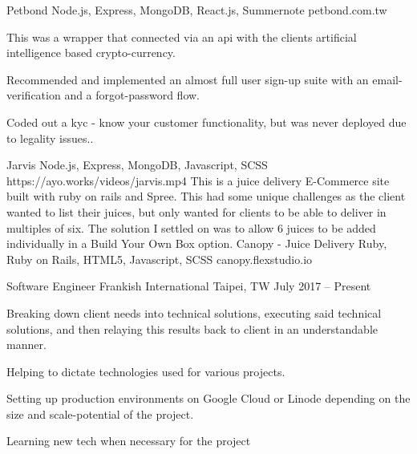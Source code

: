 \documentclass[]{awesome-cv}
\begin{document}
\begin{cventries}
{{\begin{cvitems}
	\end{cvitems}}\vspace{-7mm}}
	{Petbond}
	{Node.js, Express, MongoDB, React.js, Summernote}
	{petbond.com.tw}
	{}
	\cventry
	{{This was a wrapper that connected via an api with the client\textquotesingle{}s artificial intelligence based crypto-currency.}
	    \vspace{5mm}
		{\begin{cvitems}
    	\item { Recommended and implemented an almost full user sign-up suite with an email-verification and a forgot-password flow.}
    	\item { Coded out a kyc - know your customer functionality, but was never deployed due to legality issues..}
	\end{cvitems}}\vspace{-7mm}}
	{Jarvis}
	{Node.js, Express, MongoDB, Javascript, SCSS}
	{https://ayo.works/videos/jarvis.mp4}
	{}
	\cventry
	{{This is a juice delivery E-Commerce site built with ruby on rails and Spree. This had some unique challenges as the client wanted to list their juices, but only wanted for clients to be able to deliver in multiples of six. The solution I settled on was to allow 6 juices to be added individually in a Build Your Own Box option.}
    \vspace{-5mm}}
	{Canopy - Juice Delivery}
	{Ruby, Ruby on Rails, HTML5, Javascript, SCSS}
	{canopy.flexstudio.io}
	{}

\end{cventries}
\begin{cventries}
	\cventry
	{Software Engineer}
	{Frankish International}
	{Taipei, TW}
	{July 2017 – Present}
	{\begin{cvitems}
		\item {Breaking down client needs into technical solutions, executing said technical solutions, and then relaying this results back to client in an understandable manner.}
		\item {Helping to dictate technologies used for various projects.}
		\item {Setting up production environments on Google Cloud or Linode depending on the size and scale-potential of the project.}
		\item {Learning new tech when necessary for the project}
		\end{cvitems}}
\end{cventries}
\end{document}
